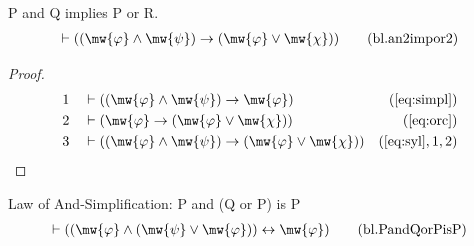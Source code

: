 \begin{lemma} {P and Q implies P or R.}
\begin{align}
\vdash ( ( \mw{\varphi} \wedge \mw{\psi} ) \rightarrow ( \mw{\varphi} \vee
    \mw{\chi} ) )\label{eq:bl.an2impor2}\tag{bl.an2impor2}
\end{align}
\end{lemma}


\begin{proof}
\begin{align}
  1 &&  & \vdash ( ( \mw{\varphi} \wedge \mw{\psi} ) \rightarrow \mw{\varphi}
     )&(\mbox{\ref{eq:simpl}})\notag
  \\ 2 &&  & \vdash ( \mw{\varphi} \rightarrow ( \mw{\varphi} \vee \mw{\chi} )
     )&(\mbox{\ref{eq:orc}})\notag
  \\ 3 &&  & \vdash ( ( \mw{\varphi} \wedge \mw{\psi} ) \rightarrow (
     \mw{\varphi} \vee \mw{\chi} )
     )&(\mbox{\ref{eq:syl}},1,2)\notag
\end{align}
\end{proof}

\begin{lemma} {Law of And-Simplification: P and (Q
or P) is P}
\begin{align}
\vdash ( ( \mw{\varphi} \wedge ( \mw{\psi} \vee \mw{\varphi} ) )
    \leftrightarrow \mw{\varphi} )\label{eq:bl.PandQorPisP}\tag{bl.PandQorPisP}
\end{align}
\end{lemma}


